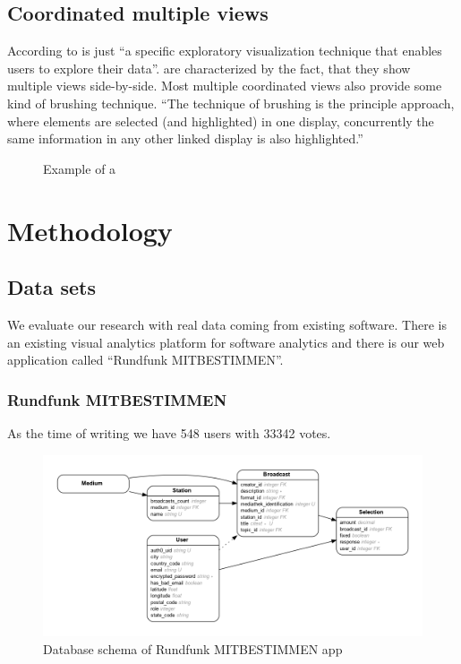 \documentclass{article}
\begin{document}
\subsection{Coordinated multiple views}
According to \textcite{cmv:state_of_the_art} \cmvs{} is just ``a specific exploratory visualization technique that enables users to explore their data''.
\cmvs{} are characterized by the fact, that they show multiple views side-by-side.
Most multiple coordinated views also provide some kind of brushing technique.
``The technique of brushing is the principle approach, where elements are selected (and highlighted) in one display, concurrently the same information in any other linked display is also highlighted.''\cite{cmv:state_of_the_art}

\begin{figure}[h]
\centering
\caption{Example of a \cmvs{}}
\label{fig:research:cmv}
\end{figure}

\section{Methodology}

\subsection{Data sets}
We evaluate our research with real data coming from existing software.
There is an existing visual analytics platform for software analytics and there is our web application called ``Rundfunk MITBESTIMMEN''.

\subsubsection{Rundfunk MITBESTIMMEN}
As the time of writing we have 548 users with 33342 votes.

\begin{figure}[h]
\centering
  \includegraphics[width=\textwidth]{images/er}
  \caption{Database schema of Rundfunk MITBESTIMMEN app}
  \label{fig:data:rundfunk}
\end{figure}
\end{document}
